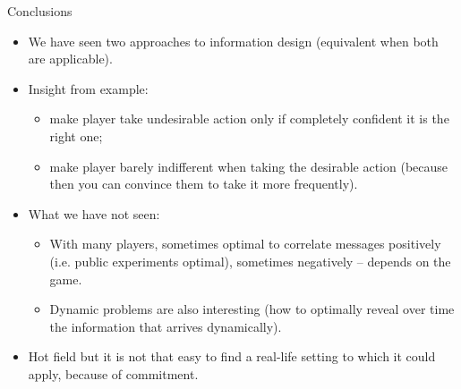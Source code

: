 \documentclass[english,10pt
,aspectratio=169
]{beamer}
\begin{document}
\begin{frame}{Conclusions}
\begin{itemize}
	\item We have seen two approaches to information design (equivalent when both are applicable).
	\item Insight from example: 
	\begin{itemize}
		\item make player take undesirable action only if completely confident it is the right one;
		\item make player barely indifferent when taking the desirable action (because then you can convince them to take it more frequently).
	\end{itemize}
	\item What we have not seen:
	\begin{itemize}
		\item With many players, sometimes optimal to correlate messages positively (i.e. public experiments optimal), sometimes negatively -- depends on the game.
		\item Dynamic problems are also interesting (how to optimally reveal over time the information that arrives dynamically).
	\end{itemize}
	\item Hot field but it is not that easy to find a real-life setting to which it could apply, because of \alert{commitment}.
\end{itemize}
\end{frame}
\end{document}
